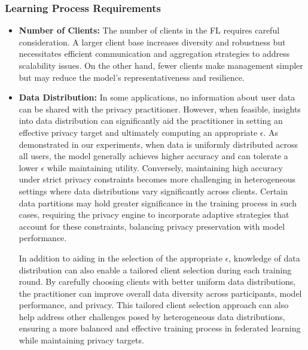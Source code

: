 \subsubsection{Learning Process Requirements}
\begin{itemize}
    \item \textbf{Number of Clients:} The number of clients in the FL requires careful consideration. A larger client base increases diversity and robustness but necessitates efficient communication and aggregation strategies to address scalability issues. On the other hand, fewer clients make management simpler but may reduce the model's representativeness and resilience.
    \item \textbf{Data Distribution:}
   In some applications, no information about user data can be shared with the privacy practitioner. However, when feasible, insights into data distribution can significantly aid the practitioner in setting an effective privacy target and ultimately computing an appropriate $\epsilon$. As demonstrated in our experiments, when data is uniformly distributed across all users, the model generally achieves higher accuracy and can tolerate a lower $\epsilon$ while maintaining utility. Conversely, maintaining high accuracy under strict privacy constraints becomes more challenging in heterogeneous settings where data distributions vary significantly across clients. Certain data partitions may hold greater significance in the training process in such cases, requiring the privacy engine to incorporate adaptive strategies that account for these constraints, balancing privacy preservation with model performance.
   
   In addition to aiding in the selection of the appropriate $\epsilon$, knowledge of data distribution can also enable a tailored client selection during each training round. By carefully choosing clients with better uniform data distributions, the practitioner can improve overall data diversity across participants, model performance, and privacy. This tailored client selection approach can also help address other challenges posed by heterogeneous data distributions, ensuring a more balanced and effective training process in federated learning while maintaining privacy targets.
   

\end{itemize}
